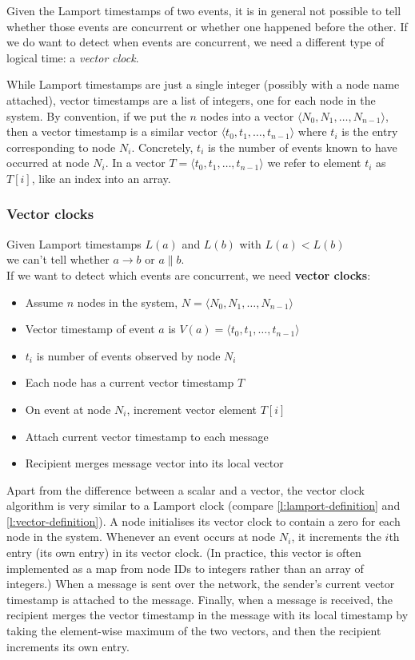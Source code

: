 Given the Lamport timestamps of two events, it is in general not possible to tell whether those events are concurrent or whether one happened before the other.
If we do want to detect when events are concurrent, we need a different type of logical time: a \emph{vector clock}.

While Lamport timestamps are just a single integer (possibly with a node name attached), vector timestamps are a list of integers, one for each node in the system.
By convention, if we put the $n$ nodes into a vector $\langle N_0, N_1, \dots, N_{n-1} \rangle$, then a vector timestamp is a similar vector $\langle t_0, t_1, \dots, t_{n-1} \rangle$ where $t_i$ is the entry corresponding to node $N_i$.
Concretely, $t_i$ is the number of events known to have occurred at node $N_i$.
In a vector $T = \langle t_0, t_1, \dots, t_{n-1} \rangle$ we refer to element $t_i$ as $T[i]$, like an index into an array.

\begin{frame}
    \label{s:vector-clocks}
    \frametitle{Vector clocks}
    Given Lamport timestamps $L(a)$ and $L(b)$ with $L(a) < L(b)$\\we can't tell whether $a \rightarrow b$ or $a \parallel b$.\\[1em]
    If we want to detect which events are concurrent, we need \textbf{vector clocks}:\pause
    \begin{itemize}
        \item Assume $n$ nodes in the system, $N = \langle N_0, N_1, \dots, N_{n-1} \rangle$\pause
        \item Vector timestamp of event $a$ is $V(a) = \langle t_0, t_1, \dots, t_{n-1}\rangle$
        \item $t_i$ is number of events observed by node $N_i$\pause
        \item Each node has a current vector timestamp $T$
        \item On event at node $N_i$, increment vector element $T[i]$\pause
        \item Attach current vector timestamp to each message
        \item Recipient merges message vector into its local vector
    \end{itemize}
\end{frame}
\label{l:vector-clocks}

Apart from the difference between a scalar and a vector, the vector clock algorithm is very similar to a Lamport clock (compare \autoref{l:lamport-definition} and \autoref{l:vector-definition}).
A node initialises its vector clock to contain a zero for each node in the system.
Whenever an event occurs at node $N_i$, it increments the $i$th entry (its own entry) in its vector clock.
(In practice, this vector is often implemented as a map from node IDs to integers rather than an array of integers.)
When a message is sent over the network, the sender's current vector timestamp is attached to the message.
Finally, when a message is received, the recipient merges the vector timestamp in the message with its local timestamp by taking the element-wise maximum of the two vectors, and then the recipient increments its own entry.


